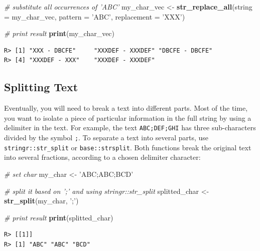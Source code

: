 \documentclass[
  12pt,
]{book}
\newenvironment{Shaded}{\begin{snugshade}}{\end{snugshade}}
\newcommand{\CommentTok}[1]{\textcolor[rgb]{0.37,0.37,0.37}{\textit{#1}}}
\newcommand{\DataTypeTok}[1]{\textcolor[rgb]{0.27,0.27,0.27}{#1}}
\newcommand{\KeywordTok}[1]{\textcolor[rgb]{0.27,0.27,0.27}{\textbf{#1}}}
\newcommand{\NormalTok}[1]{#1}
\newcommand{\StringTok}[1]{\textcolor[rgb]{0.5,0.5,0.5}{#1}}
\begin{document}
\begin{Shaded}
\begin{Highlighting}[]
\CommentTok{# substitute all occurrences of 'ABC'}
\NormalTok{my_char_vec <-}\StringTok{ }\KeywordTok{str_replace_all}\NormalTok{(}\DataTypeTok{string =}\NormalTok{ my_char_vec,}
                               \DataTypeTok{pattern =} \StringTok{'ABC'}\NormalTok{,}
                               \DataTypeTok{replacement =} \StringTok{'XXX'}\NormalTok{)}

\CommentTok{# print result}
\KeywordTok{print}\NormalTok{(my_char_vec)}
\end{Highlighting}
\end{Shaded}

\begin{verbatim}
R> [1] "XXX - DBCFE"     "XXXDEF - XXXDEF" "DBCFE - DBCFE"  
R> [4] "XXXDEF - XXX"    "XXXDEF - XXXDEF"
\end{verbatim}

\hypertarget{splitting-text}{%
\subsection{Splitting Text}\label{splitting-text}}

Eventually, you will need to break a text into different parts. Most of the time, you want to isolate a piece of particular information in the full string by using a delimiter in the text. For example, the text \texttt{\textquotesingle{}ABC;DEF;GHI\textquotesingle{}} has three sub-characters divided by the symbol \texttt{;}. To separate a text into several parts, use \texttt{stringr::str\_split} or \texttt{base::strsplit}. Both functions break the original text into several fractions, according to a chosen delimiter character:  

\begin{Shaded}
\begin{Highlighting}[]
\CommentTok{# set char}
\NormalTok{my_char <-}\StringTok{ 'ABC;ABC;BCD'}

\CommentTok{# split it based on ';' and using stringr::str_split}
\NormalTok{splitted_char <-}\StringTok{ }\KeywordTok{str_split}\NormalTok{(my_char, }\StringTok{';'}\NormalTok{)}

\CommentTok{# print result}
\KeywordTok{print}\NormalTok{(splitted_char)}
\end{Highlighting}
\end{Shaded}

\begin{verbatim}
R> [[1]]
R> [1] "ABC" "ABC" "BCD"
\end{verbatim}
\end{document}
